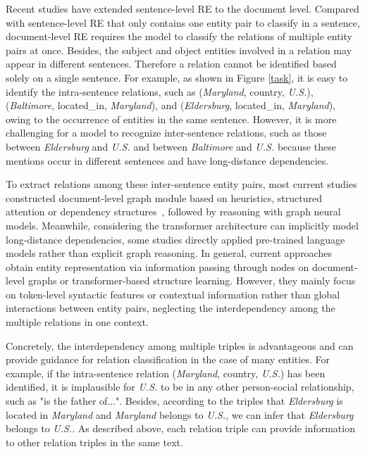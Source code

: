 \documentclass{article}
\begin{document}
Recent studies \cite{Yao2019DocREDAL,tang2020hin,zeng2020double,wang2020global,zhou2020document} have extended sentence-level RE to the document level. Compared with sentence-level RE that only contains one entity pair to classify in a sentence, document-level RE requires the model to classify the relations of multiple entity pairs at once.
Besides, the subject and object entities involved in a relation may appear in different sentences. Therefore a relation cannot be identified based solely on a single sentence. 
For example, as shown in Figure \ref{task}, it is easy to identify the intra-sentence relations, such as (\emph{Maryland}, country, \emph{U.S.}), (\emph{Baltimore}, located\_in, \emph{Maryland}), and (\emph{Eldersburg}, located\_in, \emph{Maryland}), owing to the occurrence of entities in the same sentence. However, it is more challenging for a model to recognize inter-sentence relations, such as those between \emph{Eldersburg} and \emph{U.S.} and between \emph{Baltimore}  and \emph{U.S.} because these mentions occur in different sentences and have long-distance dependencies. 

To extract relations among these inter-sentence entity pairs, most current studies constructed document-level graph module based on heuristics, structured attention or dependency structures~\cite{Peng2017CrossSentenceNR,Christopoulou2019ConnectingTD,Nan2020ReasoningWL,zeng2020double,wang2020global}, followed by reasoning with graph neural models. Meanwhile, considering the transformer architecture can implicitly model long-distance dependencies, some studies \cite{Wang2019FinetuneBF,tang2020hin,zhou2020document} directly applied pre-trained language models rather than explicit graph reasoning. In general, current approaches obtain entity representation via information passing through nodes on document-level graphs or transformer-based structure learning. 
However, they mainly focus on token-level syntactic features or contextual information rather than global interactions between entity pairs, neglecting the interdependency among the multiple relations in one context.  

Concretely, the interdependency among multiple triples is advantageous and can provide guidance for relation classification in the case of many entities. For example, if the intra-sentence relation (\emph{Maryland}, country, \emph{U.S.}) has been identified, it is implausible for \emph{U.S.} to be in any other person-social relationship, such as "is the father of...".
Besides, according to the triples that \textit{Eldersburg} is located in \textit{Maryland} and \textit{Maryland} belongs to \textit{U.S.}, we can infer that \textit{Eldersburg} belongs to \textit{U.S.}.
As described above, each relation triple can provide information to other relation triples in the same text. 
\end{document}
